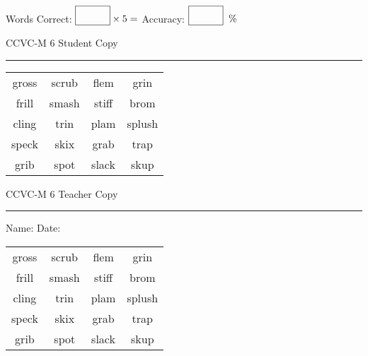 \documentclass{memoir}
\begin{document}
\small

Words Correct: $\fbox{\phantom{\huge 100}} \times 5 = $ Accuracy: $\fbox{\phantom{\huge 100}}\;\; \%$ 

\vfill

\newpage


\footnotesize \noindent
CCVC-M 6 \hfill Student Copy
\smallskip
\hrule

\Large

\setlength{\tabcolsep}{14pt}
\def\arraystretch{3}

{\selectfont


\begin{vplace}[0.5]
\begin{center}
\begin{tabular}{cccc}
gross                    & scrub & flem & grin     \\
frill & smash & stiff & brom          \\
cling & trin & plam & splush \\
speck & skix & grab                    & trap \\
grib     & spot & slack            & skup \\
\end{tabular}
\end{center}
\end{vplace}

}

\newpage

\footnotesize \noindent
CCVC-M 6 \hfill Teacher Copy
\smallskip
\hrule

\small

\vfill

\noindent
Name: \underline{\hspace{1.75in}} \hfill Date: \underline{\hspace{1in}}

\Large

{\selectfont


\begin{vplace}[0.5]
\begin{center}
\begin{tabular}{cccc}
gross                    & scrub & flem & grin     \\
frill & smash & stiff & brom          \\
cling & trin & plam & splush \\
speck & skix & grab                    & trap \\
grib     & spot & slack            & skup \\
\end{tabular}
\end{center}
\end{vplace}



}
\end{document}
